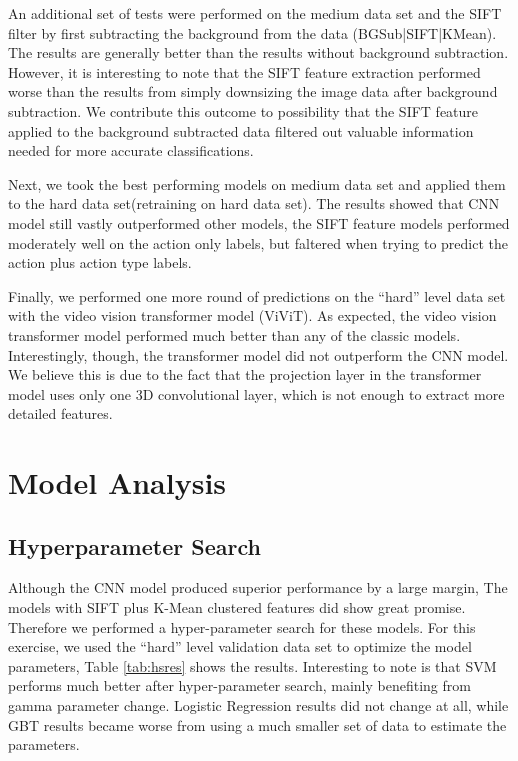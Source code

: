 \documentclass[
	a4paper, %
	10pt, %
	unnumberedsections, %
	twoside, %
]{t0004}
\begin{document}
An additional set of tests were performed on the medium data set and the SIFT filter by first subtracting the background from the data (BGSub|SIFT|KMean). The results are generally better than the results without background subtraction. However, it is interesting to note that the SIFT feature extraction performed worse than the results from simply downsizing the image data after background subtraction. We contribute this outcome to possibility that the SIFT feature applied to the background subtracted data filtered out valuable information needed for more accurate classifications.

Next, we took the best performing models on medium data set and applied them to the hard data set(retraining on hard data set). The results showed that CNN model still vastly outperformed other models, the SIFT feature models performed moderately well on the action only labels, but faltered when trying to predict the action plus action type labels.

Finally, we performed one more round of predictions on the ``hard'' level data set with the video vision transformer model (ViViT). As expected, the video vision transformer model performed much better than any of the classic models. Interestingly, though, the transformer model did not outperform the CNN model. We believe this is due to the fact that the projection layer in the transformer model uses only one 3D convolutional layer, which is not enough to extract more detailed features.

\section{Model Analysis}

\subsection{Hyperparameter Search}

Although the CNN model produced superior performance by a large margin, The models with SIFT plus K-Mean clustered features did show great promise. Therefore we performed a hyper-parameter search for these models. For this exercise, we used the ``hard'' level validation data set to optimize the model parameters, Table \ref{tab:hsres} shows the results. Interesting to note is that SVM performs much better after hyper-parameter search, mainly benefiting from gamma parameter change. Logistic Regression results did not change at all, while GBT results became worse from using a much smaller set of data to estimate the parameters.
\end{document}
